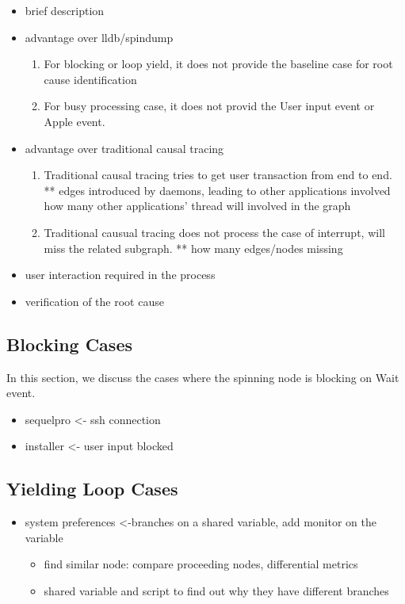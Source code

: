 \begin{itemize}
\item{brief description}
\item{advantage over lldb/spindump}
	\begin{enumerate}
	\item For blocking or loop yield, it does not provide the baseline case for root cause identification
	\item For busy processing case, it does not provid the User input event or Apple event.
	\end{enumerate}
\item{advantage over traditional causal tracing}
	\begin{enumerate}
	\item Traditional causal tracing tries to get user transaction from end to end.
		** edges introduced by daemons, leading to other applications involved
			how many other applications' thread will involved in the graph
	\item Traditional causual tracing does not process the case of interrupt,
		will miss the related subgraph.
		** how many edges/nodes missing
	\end{enumerate}
\item{user interaction required in the process}
\item{verification of the root cause}
\end{itemize}

\subsection{Blocking Cases}
In this section, we discuss the cases where the spinning node is blocking on Wait event.
\begin{itemize}
\item sequelpro <- ssh connection
\item installer <- user input blocked
\end{itemize}


\subsection{Yielding Loop Cases}
\begin{itemize}
\item system preferences <-branches on a shared variable, add monitor on the variable
	\begin{itemize}
		\item find similar node: compare proceeding nodes, differential metrics
		\item shared variable and script to find out why they have different branches
	\end{itemize}
\end{itemize}

